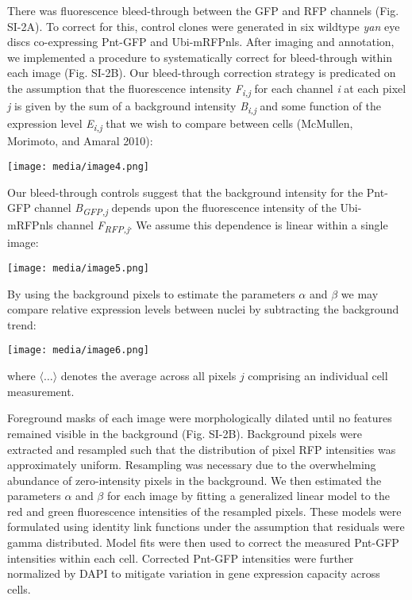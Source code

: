 There was fluorescence bleed-through between the GFP and RFP channels (Fig. SI-2A). To correct for this, control clones were generated in six wildtype \textit{yan} eye discs co-expressing Pnt-GFP and Ubi-mRFPnls. After imaging and annotation, we implemented a procedure to systematically correct for bleed-through within each image (Fig. SI-2B). Our bleed-through correction strategy is predicated on the assumption that the fluorescence intensity \textit{F\textsubscript{i,j}} for each channel \textit{i} at each pixel \textit{j} is given by the sum of a background intensity \textit{B\textsubscript{i,j}} and some function of the expression level \textit{E\textsubscript{i,j}} that we wish to compare between cells (McMullen, Morimoto, and Amaral 2010):

\texttt{[image: media/image4.png]}

Our bleed-through controls suggest that the background intensity for the Pnt-GFP channel \textit{B\textsubscript{GFP,j}} depends upon the fluorescence intensity of the Ubi-mRFPnls channel \textit{F\textsubscript{RFP,j}}. We assume this dependence is linear within a single image:

\texttt{[image: media/image5.png]}

By using the background pixels to estimate the parameters $\alpha$ and $\beta$ we may compare relative expression levels between nuclei by subtracting the background trend:

\texttt{[image: media/image6.png]}

where $\langle \ldots \rangle$ denotes the average across all pixels $j$ comprising an individual cell measurement.

Foreground masks of each image were morphologically dilated until no features remained visible in the background (Fig. SI-2B). Background pixels were extracted and resampled such that the distribution of pixel RFP intensities was approximately uniform. Resampling was necessary due to the overwhelming abundance of zero-intensity pixels in the background. We then estimated the parameters $\alpha$ and $\beta$ for each image by fitting a generalized linear model to the red and green fluorescence intensities of the resampled pixels. These models were formulated using identity link functions under the assumption that residuals were gamma distributed. Model fits were then used to correct the measured Pnt-GFP intensities within each cell. Corrected Pnt-GFP intensities were further normalized by DAPI to mitigate variation in gene expression capacity across cells.

